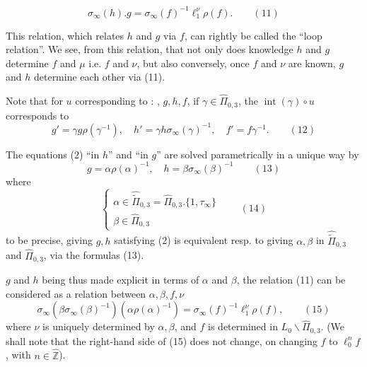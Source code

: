 

\[
\boxed{\sigma_\infty(h).g=\sigma_\infty(f)^{-1}\ell_1^\nu\rho(f)}.
\qquad (11)
\]

This relation, which relates $h$ and $g$ via $f$, can rightly be called the ``loop relation''.
We see, from this relation, that  not only does knowledge   $h$ and $g$ determine $f$ and $\mu$ i.e. $f$ and $\nu$, but also conversely, once $f$ and $\nu$ are known, $g$ and $h$ determine each other via (11).


Note that for $u$ corresponding to : , $g,h,f$, if $\gamma\in\widehat{\Pi}_{0,3}$, the   $\operatorname{int}(\gamma)\circ u$ corresponds to
\[
g'=\gamma g\rho(\gamma^{-1}),\quad
h'=\gamma h\sigma_\infty(\gamma)^{-1},\quad
f'=f\gamma^{-1}.
\qquad (12)
\]


The equations (2) ``in $h$'' and ``in $g$'' are solved parametrically in a unique way by
\[
g=\alpha\rho(\alpha)^{-1},\quad
h=\beta\sigma_\infty(\beta)^{-1}
\qquad (13)
\]
where
\[
\left\{\begin{array}{l}
\alpha\in\widehat{\widetilde{\Pi}}_{0,3}=\widehat{\Pi}_{0,3}.\{1,\tau_\infty\}\\
\beta\in\widehat{\Pi}_{0,3}
\end{array}\right.
\qquad (14)
\]
to be precise, giving $g,h$ satisfying (2) is equivalent resp. to giving $\alpha,\beta$ in $\widehat{\widetilde{\Pi}}_{0,3}$ and $\widehat{\Pi}_{0,3}$, via the formulas (13).



 $g$ and $h$ being thus made explicit in terms of $\alpha$ and $\beta$, the  relation (11) can be considered as a relation between $\alpha,\beta,f,\nu$
\[
\sigma_\infty(\beta\sigma_\infty(\beta)^{-1})(\alpha\rho(\alpha)^{-1})
=\sigma_\infty(f)^{-1}\ell_1^\nu\rho(f),
\qquad (15)
\]
where  $\nu$ is uniquely determined by $\alpha,\beta$, and $f$ is determined in $L_0\backslash\widehat{\Pi}_{0,3}$.
(We shall note that the right-hand side of (15) does not change, on changing $f$ to $\ell_0^n f$, with $n\in\widehat{\mathbb Z}$).

